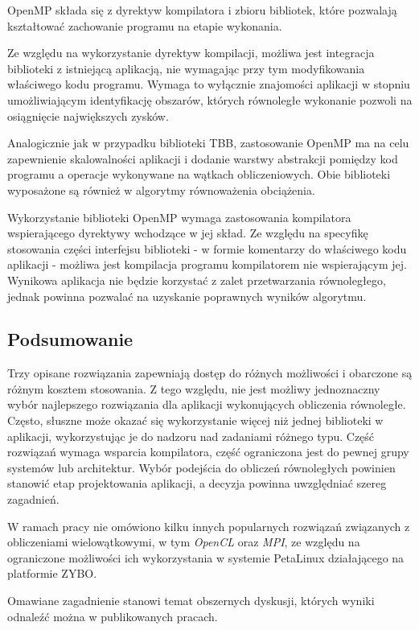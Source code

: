 OpenMP składa się z dyrektyw kompilatora i zbioru bibliotek, które pozwalają kształtować zachowanie programu na etapie wykonania.

Ze względu na wykorzystanie dyrektyw kompilacji, możliwa jest integracja biblioteki z istniejącą aplikacją, nie wymagając przy tym modyfikowania właściwego kodu programu. Wymaga to wyłącznie znajomości aplikacji w stopniu umożliwiającym identyfikację obszarów, których równoległe wykonanie pozwoli na osiągnięcie największych zysków.

Analogicznie jak w przypadku biblioteki TBB, zastosowanie OpenMP ma na celu zapewnienie skalowalności aplikacji i dodanie warstwy abstrakcji pomiędzy kod programu a operacje wykonywane na wątkach obliczeniowych. Obie biblioteki wyposażone są również w algorytmy równoważenia obciążenia.

Wykorzystanie biblioteki OpenMP wymaga zastosowania kompilatora wspierającego dyrektywy wchodzące w jej skład. Ze względu na specyfikę stosowania części interfejsu biblioteki - w formie komentarzy do właściwego kodu aplikacji - możliwa jest kompilacja programu kompilatorem nie wspierającym jej. Wynikowa aplikacja nie będzie korzystać z zalet przetwarzania równoległego, jednak powinna pozwalać na uzyskanie poprawnych wyników algorytmu.

\subsection*{Podsumowanie}
Trzy opisane rozwiązania zapewniają dostęp do różnych możliwości i obarczone są różnym kosztem stosowania. Z tego względu, nie jest możliwy jednoznaczny wybór najlepszego rozwiązania dla aplikacji wykonujących obliczenia równoległe. Często, słuszne może okazać się wykorzystanie więcej niż jednej biblioteki w aplikacji, wykorzystując je do nadzoru nad zadaniami różnego typu. 
Część rozwiązań wymaga wsparcia kompilatora, część ograniczona jest do pewnej grupy systemów lub architektur. Wybór podejścia do obliczeń równoległych powinien stanowić etap projektowania aplikacji, a decyzja powinna uwzględniać szereg zagadnień.

W ramach pracy nie omówiono kilku innych popularnych rozwiązań związanych z obliczeniami wielowątkowymi, w tym \emph{OpenCL} oraz \emph{MPI}, ze względu na ograniczone możliwości ich wykorzystania w systemie PetaLinux działającego na platformie ZYBO.

Omawiane zagadnienie stanowi temat obszernych dyskusji, których wyniki odnaleźć można w publikowanych pracach. \cite{choosing-thread-framework,Kegel2009}

